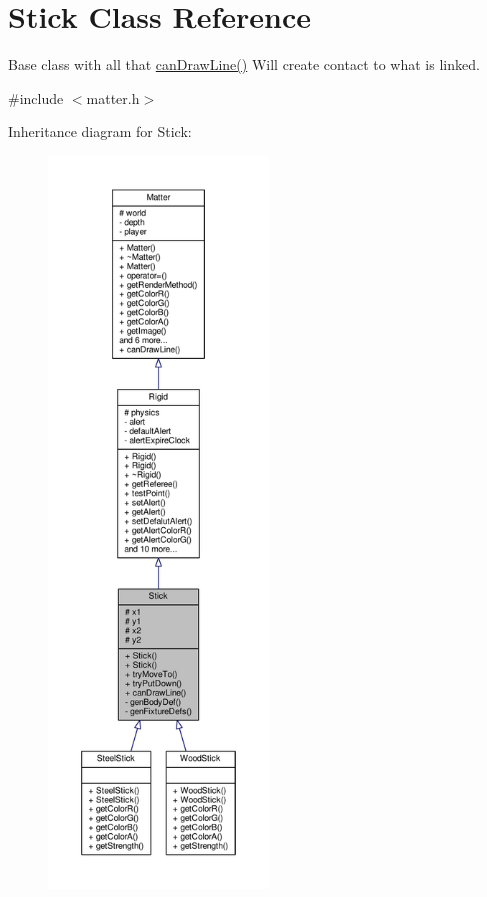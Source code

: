 \hypertarget{classStick}{}\section{Stick Class Reference}
\label{classStick}


Base class with all that \hyperlink{classStick_ad2b8a92274aed6d25d79c8b4033b2bfb}{can\+Draw\+Line()} Will create contact to what is linked.  




{\ttfamily \#include $<$matter.\+h$>$}



Inheritance diagram for Stick\+:
\nopagebreak
\begin{figure}[H]
\begin{center}
\leavevmode
\includegraphics[height=550pt]{classStick__inherit__graph}
\end{center}
\end{figure}


